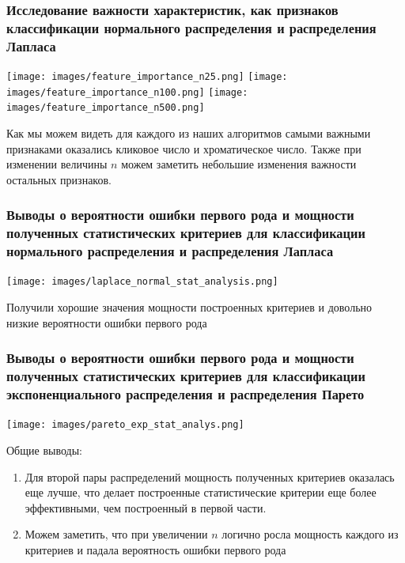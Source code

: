 \documentclass[a4paper,12pt]{article}
\begin{document}
\subsubsection{Исследование важности характеристик, как признаков классификации нормального распределения и распределения Лапласа}

\begin{center}
    \texttt{[image: images/feature\_importance\_n25.png]}
    \texttt{[image: images/feature\_importance\_n100.png]}
    \texttt{[image: images/feature\_importance\_n500.png]}
\end{center}
Как мы можем видеть для каждого из наших алгоритмов самыми важными признаками оказались кликовое число и хроматическое число. Также при изменении величины $n$ можем заметить небольшие изменения важности остальных признаков.

\subsubsection{Выводы о вероятности ошибки первого рода и мощности полученных статистических критериев для классификации нормального распределения и распределения Лапласа}
\begin{center}
    \texttt{[image: images/laplace\_normal\_stat\_analysis.png]}
\end{center}

Получили хорошие значения мощности построенных критериев и довольно низкие вероятности ошибки первого рода


\subsubsection{Выводы о вероятности ошибки первого рода и мощности полученных статистических критериев для классификации экспоненциального распределения и распределения Парето}
\begin{center}
    \texttt{[image: images/pareto\_exp\_stat\_analys.png]}
\end{center}
Общие выводы:
\begin{enumerate}
    \item Для второй пары распределений мощность полученных критериев оказалась еще лучше, что делает построенные статистические критерии еще более эффективными, чем построенный в первой части. 

    \item Можем заметить, что при увеличении $n$ логично росла мощность каждого из критериев и падала вероятность ошибки первого рода

\end{enumerate}
\end{document}
